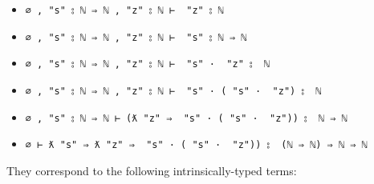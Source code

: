 \begin{itemize}
\tightlist
\item
  \texttt{∅\ ,\ "s"\ ⦂\ \textasciigrave{}ℕ\ ⇒\ \textasciigrave{}ℕ\ ,\ "z"\ ⦂\ \textasciigrave{}ℕ\ ⊢\ \textasciigrave{}\ "z"\ ⦂\ \textasciigrave{}ℕ}
\item
  \texttt{∅\ ,\ "s"\ ⦂\ \textasciigrave{}ℕ\ ⇒\ \textasciigrave{}ℕ\ ,\ "z"\ ⦂\ \textasciigrave{}ℕ\ ⊢\ \textasciigrave{}\ "s"\ ⦂\ \textasciigrave{}ℕ\ ⇒\ \textasciigrave{}ℕ}
\item
  \texttt{∅\ ,\ "s"\ ⦂\ \textasciigrave{}ℕ\ ⇒\ \textasciigrave{}ℕ\ ,\ "z"\ ⦂\ \textasciigrave{}ℕ\ ⊢\ \textasciigrave{}\ "s"\ ·\ \textasciigrave{}\ "z"\ ⦂\ \ \textasciigrave{}ℕ}
\item
  \texttt{∅\ ,\ "s"\ ⦂\ \textasciigrave{}ℕ\ ⇒\ \textasciigrave{}ℕ\ ,\ "z"\ ⦂\ \textasciigrave{}ℕ\ ⊢\ \textasciigrave{}\ "s"\ ·\ (\textasciigrave{}\ "s"\ ·\ \textasciigrave{}\ "z")\ ⦂\ \ \textasciigrave{}ℕ}
\item
  \texttt{∅\ ,\ "s"\ ⦂\ \textasciigrave{}ℕ\ ⇒\ \textasciigrave{}ℕ\ ⊢\ (ƛ\ "z"\ ⇒\ \textasciigrave{}\ "s"\ ·\ (\textasciigrave{}\ "s"\ ·\ \textasciigrave{}\ "z"))\ ⦂\ \ \textasciigrave{}ℕ\ ⇒\ \textasciigrave{}ℕ}
\item
  \texttt{∅\ ⊢\ ƛ\ "s"\ ⇒\ ƛ\ "z"\ ⇒\ \textasciigrave{}\ "s"\ ·\ (\textasciigrave{}\ "s"\ ·\ \textasciigrave{}\ "z"))\ ⦂\ \ (\textasciigrave{}ℕ\ ⇒\ \textasciigrave{}ℕ)\ ⇒\ \textasciigrave{}ℕ\ ⇒\ \textasciigrave{}ℕ}
\end{itemize}

They correspond to the following intrinsically-typed terms:

